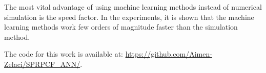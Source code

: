 \documentclass[journal]{IEEEtran}
\begin{document}
The most vital advantage of using machine learning methods instead of numerical simulation is the speed factor. In the experiments, it is shown that the machine learning methods work few orders of magnitude faster than the simulation method. 


The code for this work is available at: \url{https://github.com/Aimen-Zelaci/SPRPCF_ANN/}.


	
\end{document}
